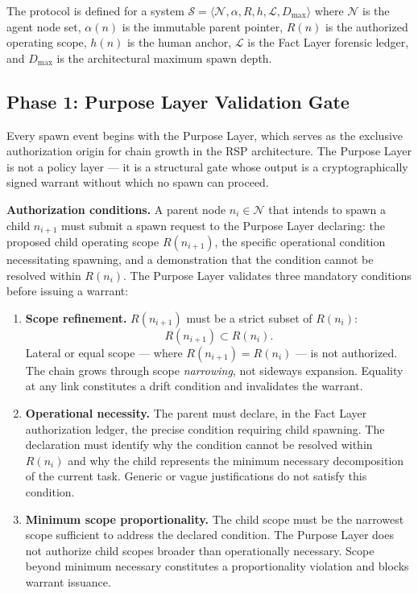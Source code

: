 The protocol is defined for a system $\mathcal{S} = \langle \mathcal{N}, \alpha, R, h, \mathcal{L}, D_{\max} \rangle$ where $\mathcal{N}$ is the agent node set, $\alpha(n)$ is the immutable parent pointer, $R(n)$ is the authorized operating scope, $h(n)$ is the human anchor, $\mathcal{L}$ is the Fact Layer forensic ledger, and $D_{\max}$ is the architectural maximum spawn depth.

\subsection{Phase 1: Purpose Layer Validation Gate}
\label{sec:rs-purpose-validation}

Every spawn event begins with the Purpose Layer, which serves as the exclusive authorization origin for chain growth in the RSP architecture. The Purpose Layer is not a policy layer --- it is a structural gate whose output is a cryptographically signed warrant without which no spawn can proceed.

\medskip
\noindent\textbf{Authorization conditions.} A parent node $n_i \in \mathcal{N}$ that intends to spawn a child $n_{i+1}$ must submit a spawn request to the Purpose Layer declaring: the proposed child operating scope $R(n_{i+1})$, the specific operational condition necessitating spawning, and a demonstration that the condition cannot be resolved within $R(n_i)$. The Purpose Layer validates three mandatory conditions before issuing a warrant:

\begin{enumerate}
    \item[(P1)] \textbf{Scope refinement.} $R(n_{i+1})$ must be a strict subset of $R(n_i)$:
    \begin{equation}
    R(n_{i+1}) \subset R(n_i).
    \label{eq:scope-refinement}
    \end{equation}
    Lateral or equal scope --- where $R(n_{i+1}) = R(n_i)$ --- is not authorized. The chain grows through scope \emph{narrowing}, not sideways expansion. Equality at any link constitutes a drift condition and invalidates the warrant.

    \item[(P2)] \textbf{Operational necessity.} The parent must declare, in the Fact Layer authorization ledger, the precise condition requiring child spawning. The declaration must identify why the condition cannot be resolved within $R(n_i)$ and why the child represents the minimum necessary decomposition of the current task. Generic or vague justifications do not satisfy this condition.

    \item[(P3)] \textbf{Minimum scope proportionality.} The child scope must be the narrowest scope sufficient to address the declared condition. The Purpose Layer does not authorize child scopes broader than operationally necessary. Scope beyond minimum necessary constitutes a proportionality violation and blocks warrant issuance.
\end{enumerate}

